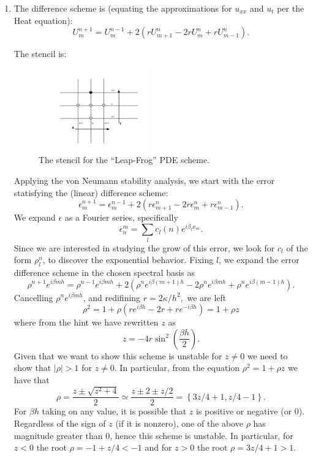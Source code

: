 \documentclass[11pt]{article}
\def\f{\frac }
\begin{document}
\begin{enumerate}
\clearpage
\pagebreak
\item The difference scheme is (equating the approximations for $u_{xx}$ and $u_t$ per the Heat equation):
\[ U_{m} ^{n+1} = U_{m} ^{n-1} +2( r U_{m+1} ^{n} -2r U_{m} ^{n} + r U_{m-1} ^{n}) .\]

The stencil is:

\begin{figure}[h!]
  \centering
    \includegraphics[width=0.45\textwidth]{337_hw12_03.pdf}
  \caption{The stencil for the ``Leap-Frog'' PDE scheme.}
\end{figure}

Applying the von Neumann stability analysis, we start with the error statisfying the (linear) difference scheme:
\[ \epsilon_{m} ^{n+1} = \epsilon_{m} ^{n-1} + 2 ( r \epsilon_{m+1} ^{n} -2r \epsilon_{m} ^{n} + r \epsilon_{m-1} ^{n} ).\]
We expand $\epsilon$ as a Fourier series, specifically
\[ \epsilon _n ^m = \sum _l c_l (n) e^{i\beta _l x_m} .\]
Since we are interested in studying the grow of this error, we look for $c_l$ of the form $\rho _l ^n$, to discover the exponential behavior.
Fixing $l$, we expand the error difference scheme in the chosen spectral basis as
\[ \rho ^{n+1} e^{i \beta m h} = \rho ^{n-1} e^{i \beta m h} + 2( \rho ^{n} e^{i \beta (m+1) h} -2 \rho ^{n} e^{i \beta m h} + \rho ^{n} e^{i \beta (m-1) h}) .\]
Cancelling $\rho ^{n} e^{i \beta m h}$, and redifining $r = 2\kappa / h^2,$ we are left
\[ \rho^2 = 1 + \rho \left ( r e^{i\beta h} -2r + re^{-i\beta h } \right ) = 1 + \rho z \]
where from the hint we have rewritten $z$ as
\[ z = -4r \sin ^2 \left ( \f{\beta h }{2} \right ) .\]
Given that we want to show this scheme is unstable for $z\ne 0$ we need to show that $|\rho | > 1$ for $z \ne 0$.
In particular, from the equation $\rho ^2 = 1 + \rho z$ we have that
\[ \rho = \f{z \pm \sqrt{z^2 + 4} }{2} \simeq \f{z \pm 2 \pm z/2 }{2} = \left \{ 3z/4 +  1 , z/4 - 1 \right \} .\]
For $\beta h$ taking on any value, it is possible that $z$ is positive or negative (or 0).
Regardless of the sign of $z$ (if it is nonzero), one of the above $\rho$ has magnitude greater than 0, hence this scheme is unstable.
In particular, for $z<0$ the root $\rho = -1 + z/4 < -1$ and for $z>0$ the root $\rho = 3z/4+1 > 1$.


\end{enumerate}
\end{document}
